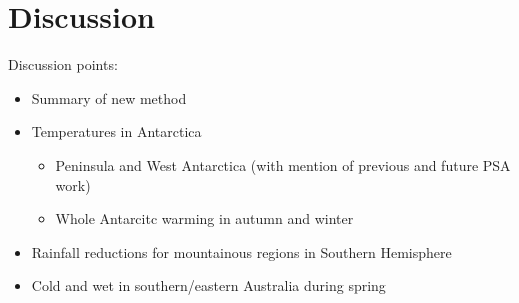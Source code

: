 \section{Discussion}

Discussion points:
\begin{itemize}
\item Summary of new method
\item Temperatures in Antarctica
\begin{itemize}
\item Peninsula and West Antarctica (with mention of previous and future PSA work)
\item Whole Antarcitc warming in autumn and winter
\end{itemize}
\item Rainfall reductions for mountainous regions in Southern Hemisphere
\item Cold and wet in southern/eastern Australia during spring
\end{itemize}